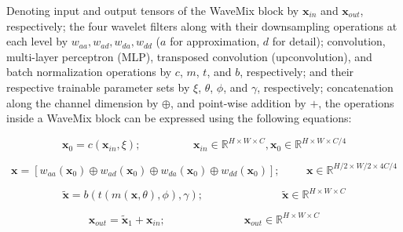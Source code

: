 \documentclass{article}
\begin{document}
Denoting input and output tensors of the WaveMix block by $\textbf{x}_{in}$ and $\textbf{x}_{out}$, respectively; the four wavelet filters along with their downsampling operations at each level by $w_{aa},w_{ad},w_{da},w_{dd}$ ($a$ for approximation, $d$ for detail); convolution, multi-layer perceptron (MLP), transposed convolution (upconvolution), and batch normalization operations by $c$, $m$, $t$, and $b$, respectively; and their respective trainable parameter sets by $\xi$, $\theta$, $\phi$, and $\gamma$, respectively; concatenation along the channel dimension by $\oplus$, and point-wise addition by $+$, the operations inside a WaveMix block can be expressed using the following equations:

\begin{equation} \label{eq:1}
    \textbf{x}_0 = c(\textbf{x}_{in},\xi);  \hspace{2cm}    
    \textbf{x}_{in}\in\mathbb{R}^{H\times W \times C}, \textbf{x}_0\in\mathbb{R}^{H\times W \times C/4}    
\end{equation}



\begin{equation}\label{eq:2}
    \textbf{x} = [w_{aa}(\textbf{x}_0) \oplus w_{ad}(\textbf{x}_0) \oplus w_{da}(\textbf{x}_0) \oplus w_{dd}(\textbf{x}_0)]; \hspace{1cm}
    \textbf{x}\in\mathbb{R}^{H/2\times W/2 \times 4C/4}
\end{equation}



\begin{equation} \label{eq:3}
    \tilde{\textbf{x}} = b(t(m(\textbf{x},\theta),\phi),\gamma); \hspace{3cm}\tilde{\textbf{x}}\in\mathbb{R}^{H\times W \times C}      
\end{equation}
 


\begin{equation}\label{eq:4}
    \textbf{x}_{out} = \tilde{\textbf{x}}_1 + \textbf{x}_{in}; \hspace{3cm}\textbf{x}_{out} \in\mathbb{R}^{H\times W \times C} 
\end{equation}
\end{document}
